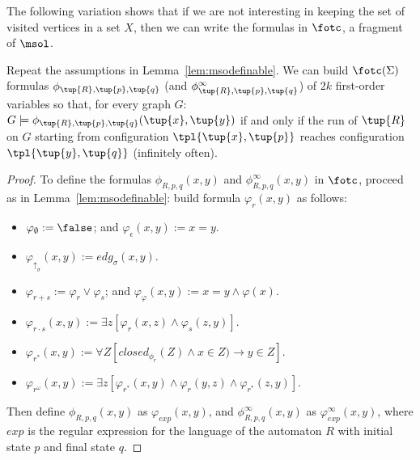 The following variation shows that if we are not interesting in keeping the set
of visited vertices in a set $X$, then we can write the formulas in $\fotc$, a
fragment of $\msol$.
\begin{lemma} \label{lem:fotcdefinable}
Repeat the assumptions in Lemma~\ref{lem:msodefinable}.
We can build $\fotc(\Sigma)$ formulas $\phi_{\tup{R},\tup{p},\tup{q}}$ (and
$\phi^\infty_{\tup{R},\tup{p},\tup{q}}$) of $2k$ first-order variables so that,
for every graph $G$: $G \models \phi_{\tup{R},\tup{p},\tup{q}}(\tup{x},\tup{y})$
if and only if the run of $\tup{R}$ on $G$ starting from configuration
$\tpl{\tup{x},\tup{p}}$ reaches configuration $\tpl{\tup{y},\tup{q}}$
(infinitely often).
\end{lemma}

\begin{proof}
To define the formulas $\phi_{R,p,q}(x,y)$ and $\phi^\infty_{R,p,q}(x,y)$ in
$\fotc$, proceed as in Lemma~\ref{lem:msodefinable}: build formula
$\varphi_r(x,y)$ as follows:
\begin{itemize}
\item $\varphi_{\emptyset} := \false$; and $\varphi_{\epsilon}(x,y) := x = y$.
\item $\varphi_{\uparrow_\sigma} (x,y) := edg_\sigma(x,y)$.
\item $\varphi_{r + s} := \varphi_{r} \vee \varphi_{s}$; and
$\varphi_{\varphi}(x,y) := x = y \wedge \varphi(x)$.

\item $\varphi_{r \cdot s}(x,y) := \exists z [\varphi_{r}(x,z) \wedge
\varphi_{s}(z,y)]$.
\item $\varphi_{r^*}(x,y) := \forall Z [closed_{\phi_r}(Z) \wedge x \in Z) \to y
\in Z]$.
\item $\varphi_{r^\omega} (x,y) := \exists z [\varphi_{r^*}(x,y) \wedge
\varphi_r(y,z) \wedge \varphi_{r^*}(z,y)]$.
\end{itemize}
Then define $\phi_{R,p,q}(x,y)$ as $\varphi_{exp}(x,y)$, and
$\phi^\infty_{R,p,q}(x,y)$ as $\varphi^\infty_{exp}(x,y)$, where $exp$ is the
regular expression for the language of the automaton $R$ with initial state $p$
and final state $q$.
\end{proof}

